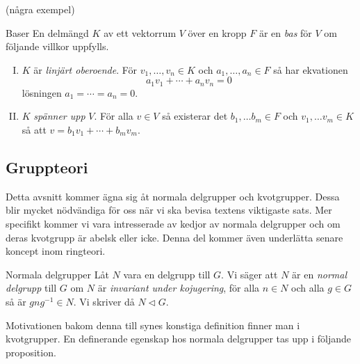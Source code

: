 \documentclass{article}
\theoremstyle{definition}
\begin{document}
(några exempel)

\begin{mydef}{Baser}{}
  En delmängd $K$ av ett vektorrum $V$ över en kropp $F$ är en \textit{bas} för $V$ om följande villkor uppfylls.  
  \begin{enumerate}[I)]
    \item $K$ är \textit{linjärt oberoende}. För $v_1, \ldots, v_n \in K$ och $a_1, \ldots, a_n \in F$ så har ekvationen 
    \[a_1v_1 + \cdots + a_n v_n = 0\]
    lösningen $a_1 = \cdots = a_n = 0$.
    \item $K$ \textit{spänner upp} $V$. För alla $v \in V$ så existerar det $b_1, \ldots b_m \in F$ och $v_1, \ldots v_m \in K$ så att 
    $v = b_1 v_1 + \cdots + b_m v_m$.
  \end{enumerate}
\end{mydef}

\subsection{Gruppteori}
Detta avsnitt kommer ägna sig åt normala delgrupper och kvotgrupper. Dessa blir mycket nödvändiga för oss när vi ska bevisa textens viktigaste sats. 
Mer specifikt kommer vi vara intresserade av kedjor av normala delgrupper och om deras kvotgrupp är abelsk eller icke. Denna 
del kommer även underlätta senare koncept inom ringteori.

\begin{mydef}{Normala delgrupper}{}
  Låt $N$ vara en delgrupp till $G$. Vi säger att $N$ är 
  en \textit{normal delgrupp} till $G$ om $N$ är 
  \textit{invariant under kojugering}, för alla $n \in N$ och 
  alla $g \in G$ så är $gng^{-1} \in N$. Vi skriver då $N \triangleleft G.$
\end{mydef}
Motivationen bakom denna till synes konstiga definition finner man i kvotgrupper. 
En definerande egenskap hos normala delgrupper tas upp i följande proposition.
\end{document}
